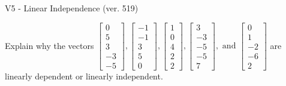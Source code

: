 \begin{exercise}
  \begin{exerciseTitle}V5 - Linear Independence (ver. 519)\end{exerciseTitle}
  \begin{exerciseStatement}
    Explain why the vectors \(\left[\begin{array}{r}
0 \\
5 \\
3 \\
-3 \\
-5
\end{array}\right] , \left[\begin{array}{r}
-1 \\
-1 \\
3 \\
5 \\
0
\end{array}\right] , \left[\begin{array}{r}
1 \\
0 \\
4 \\
2 \\
2
\end{array}\right] , \left[\begin{array}{r}
3 \\
-3 \\
-5 \\
-5 \\
7
\end{array}\right] , \text{ and } \left[\begin{array}{r}
0 \\
1 \\
-2 \\
-6 \\
2
\end{array}\right]\) are linearly dependent or linearly independent.	



\end{exerciseStatement}
\end{exercise}

